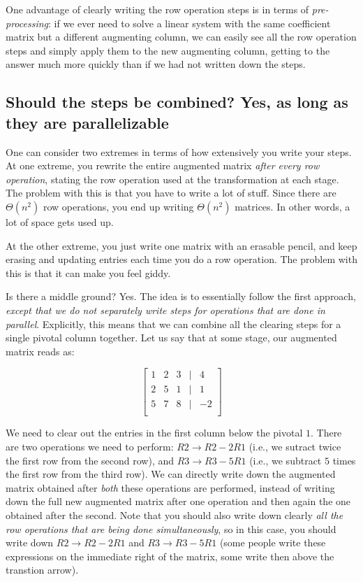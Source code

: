 \documentclass[10pt]{amsart}
\begin{document}
One advantage of clearly writing the row operation steps is in terms
of {\em pre-processing}: if we ever need to solve a linear system with
the same coefficient matrix but a different augmenting column, we can
easily see all the row operation steps and simply apply them to the
new augmenting column, getting to the answer much more quickly than if
we had not written down the steps.

\subsection{Should the steps be combined? Yes, as long as they are parallelizable}

One can consider two extremes in terms of how extensively you write
your steps. At one extreme, you rewrite the entire augmented matrix
{\em after every row operation}, stating the row operation used at the
transformation at each stage. The problem with this is that you have
to write a lot of stuff. Since there are $\Theta(n^2)$ row operations,
you end up writing $\Theta(n^2)$ matrices. In other words, a lot of
space gets used up.

At the other extreme, you just write one matrix with an erasable
pencil, and keep erasing and updating entries each time you do a row
operation. The problem with this is that it can make you feel giddy.

Is there a middle ground? Yes. The idea is to essentially follow the
first approach, {\em except that we do not separately write steps for
  operations that are done in parallel}. Explicitly, this means that
we can combine all the clearing steps for a single pivotal column
together. Let us say that at some stage, our augmented matrix reads as:

$$\left[\begin{matrix} 1 & 2 & 3 & \mid & 4\\ 2 & 5 & 1 & \mid & 1\\ 5 & 7 & 8 & \mid & -2\\\end{matrix}\right]$$

We need to clear out the entries in the first column below the pivotal
$1$. There are two operations we need to perform: $R2 \to R2 - 2R1$
(i.e., we sutract twice the first row from the second row), and $R3
\to R3 - 5R1$ (i.e., we subtract $5$ times the first row from the
third row). We can directly write down the augmented matrix obtained
after {\em both} these operations are performed, instead of writing
down the full new augmented matrix after one operation and then again
the one obtained after the second. Note that you should also write
down clearly {\em all the row operations that are being done
  simultaneously}, so in this case, you should write down $R2 \to R2 -
2R1$ and $R3 \to R3 - 5R1$ (some people write these expressions on the
immediate right of the matrix, some write then above the transtion
arrow).
\end{document}
